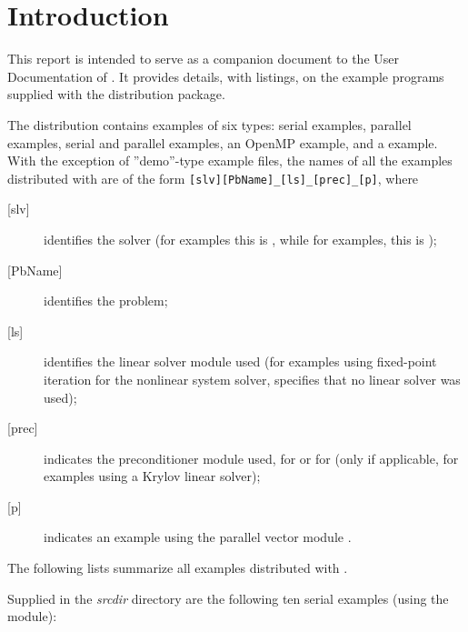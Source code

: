 \section{Introduction}\label{s:ex_intro}

This report is intended to serve as a companion document to the User
Documentation of {\cvode} \cite{cvode_ug}.  It provides details, with
listings, on the example programs supplied with the {\cvode} distribution
package.

The {\cvode} distribution contains examples of six types: serial
{\CC} examples, parallel {\CC} examples, serial and parallel {\F}
examples, an OpenMP example, and a {\hypre} example.
With the exception of ''demo''-type example files, the names of all the examples
distributed with {\sundials} are of the form \verb![slv][PbName]_[ls]_[prec]_[p]!,
where
\begin{description}
\item [{[slv]}] identifies the solver (for {\cvode} examples this is ,
  while for {\fcvode} examples, this is );
\item [{[PbName]}] identifies the problem;
\item [{[ls]}] identifies the linear solver module used (for examples using
  fixed-point iteration for the nonlinear system solver,  specifies
  that no linear solver was used);
\item [{[prec]}] indicates the {\cvode} preconditioner module used,  for {\cvbandpre}
  or  for {\cvbbdpre}
  (only if applicable, for examples using a Krylov linear solver);
\item [{[p]}] indicates an example using the parallel vector module {\nvecp}.
\end{description}

\vspace{0.2in}\noindent
The following lists summarize all examples distributed with {\cvode}.

\vspace{0.2in}\noindent
Supplied in the {\em srcdir} directory are the
following ten serial examples (using the {\nvecs} module):

